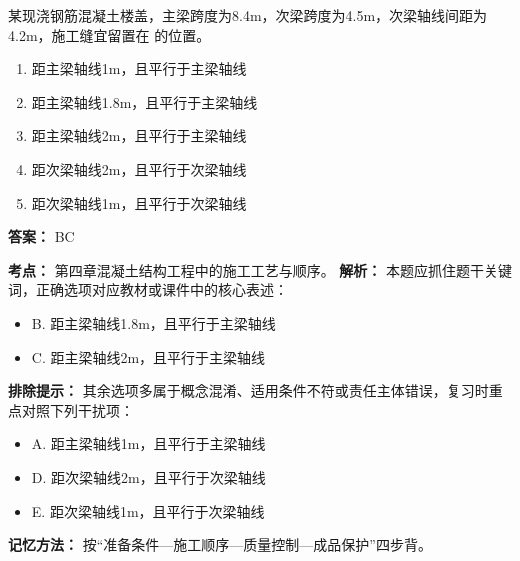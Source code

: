 \documentclass[UTF8,fontset=fandol,11pt]{ctexart}
\begin{document}
\begin{quizbox}[title={第 77 题}]
某现浇钢筋混凝土楼盖，主梁跨度为8.4m，次梁跨度为4.5m，次梁轴线间距为4.2m，施工缝宜留置在 的位置。\\
\begin{enumerate}[label=\Alph*.]
\item 距主梁轴线1m，且平行于主梁轴线
\item 距主梁轴线1.8m，且平行于主梁轴线
\item 距主梁轴线2m，且平行于主梁轴线
\item 距次梁轴线2m，且平行于次梁轴线
\item 距次梁轴线1m，且平行于次梁轴线
\end{enumerate}
\textbf{答案：} BC
\vspace{0.25em}
\begin{answerbox}[title={考点解析}]
\textbf{考点：} 第四章混凝土结构工程中的施工工艺与顺序。
\textbf{解析：} 本题应抓住题干关键词，正确选项对应教材或课件中的核心表述：
\begin{itemize}
\item B. 距主梁轴线1.8m，且平行于主梁轴线
\item C. 距主梁轴线2m，且平行于主梁轴线
\end{itemize}
\textbf{排除提示：} 其余选项多属于概念混淆、适用条件不符或责任主体错误，复习时重点对照下列干扰项：
\begin{itemize}
\item A. 距主梁轴线1m，且平行于主梁轴线
\item D. 距次梁轴线2m，且平行于次梁轴线
\item E. 距次梁轴线1m，且平行于次梁轴线
\end{itemize}
\textbf{记忆方法：} 按“准备条件—施工顺序—质量控制—成品保护”四步背。
\end{answerbox}
\end{quizbox}
\end{document}
